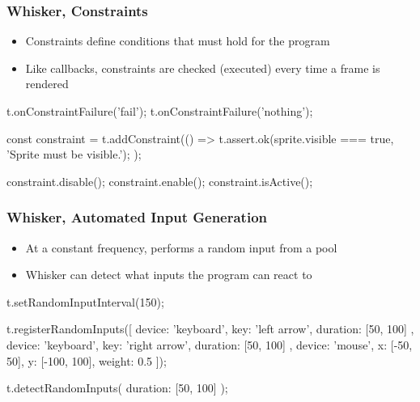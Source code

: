 \begin{frame}[fragile]\frametitle{Whisker, Constraints}
    \begin{itemize}
        \item Constraints \textcolor{upfim}{define conditions} that must hold for the program
        \item Like callbacks, constraints are checked (executed) every time a frame is rendered
    \end{itemize}

    \begin{javascriptcode}
        t.onConstraintFailure('fail');
        t.onConstraintFailure('nothing');

        const constraint = t.addConstraint(() => {
            t.assert.ok(sprite.visible === true, 'Sprite must be visible.');
        });

        constraint.disable();
        constraint.enable();
        constraint.isActive();
    \end{javascriptcode}
\end{frame}

\begin{frame}[fragile]\frametitle{Whisker, Automated Input Generation}
    \begin{itemize}
        \item At a constant frequency, performs a random input from a pool
        \item Whisker can detect what inputs the program can react to
    \end{itemize}

    \begin{javascriptcode}
        t.setRandomInputInterval(150);

        t.registerRandomInputs([
            { device: 'keyboard', key: 'left arrow', duration: [50, 100] },
            { device: 'keyboard', key: 'right arrow', duration: [50, 100] },
            { device: 'mouse', x: [-50, 50], y: [-100, 100], weight: 0.5 }
        ]);

        t.detectRandomInputs({ duration: [50, 100] });
    \end{javascriptcode}
\end{frame}

\newcommand{\tablebox}[1]{
    \begin{tikzpicture}
         \node[draw, text width=7.5cm, minimum height=0.6cm, rounded corners] {\footnotesize #1};
    \end{tikzpicture}
}

